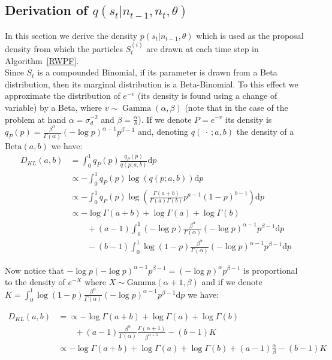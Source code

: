 \documentclass[12pt]{article}
\begin{document}
\begin{appendices}
	\subsection{Derivation of $q(s_t|n_{t-1}, n_t, \theta)$}
	In this section we derive the density $p(s_t|n_{t-1}, \theta)$ which is used as the proposal density from which the particles $S_t^{(i)}$ are drawn at each time step in Algorithm~\ref{RWPF}. \\
	Since $S_t$ is a compounded Binomial, if its parameter is drawn from a Beta distribution, then its marginal distribution is a Beta-Binomial. To this effect we approximate the distribution of $e^{-v}$ (its density is found using a change of variable) by a Beta, where $v \sim \operatorname{Gamma}(\alpha, \beta)$ (note that in the case of the problem at hand $\alpha=\sigma_d^{-2}$ and $\beta=\frac{\alpha}{\delta}$). 
	If we denote $P=e^{-v}$ its density is $q_P(p)=\frac{\beta^\alpha}{\Gamma(\alpha)}(-\log p)^{\alpha-1}p^{\beta-1}$ and, denoting $q(\ \cdot \ ; a, b)$ the density of a $\mathrm{Beta}(a,b)$ we have:	
	\begin{align*}
	D_{KL}(a,b) & = \int_{0}^{1}q_P(p)\frac{q_P(p)}{q(p; a, b)}\mathrm{d}p \\
	& \propto - \int_{0}^{1}q_P(p)\log(q(p; a, b))\mathrm{d}p \\
	& \propto - \int_{0}^{1}q_P(p)\log(\frac{\Gamma(a+b)}{\Gamma(a)\Gamma(b)}p^{a-1}(1-p)^{b-1})\mathrm{d}p \\
	& \propto -\log\Gamma(a+b) + \log\Gamma(a) + \log\Gamma(b) \\ & \qquad  + (a-1)\int_{0}^{1}(-\log p)\frac{\beta^\alpha}{\Gamma(\alpha)}(-\log p)^{\alpha-1}p^{\beta-1}\mathrm{d}p \\ & \qquad - (b-1)\int_{0}^{1}\log (1-p)\frac{\beta^\alpha}{\Gamma(\alpha)}(-\log p)^{\alpha-1}p^{\beta-1}\mathrm{d}p
	\end{align*}
	
	Now notice that $-\log p(-\log p)^{\alpha-1}p^{\beta-1}= (-\log p)^{\alpha}p^{\beta-1}$ is proportional to the density of $e^{-X}$ where $X \sim \mathrm{Gamma}(\alpha+1, \beta)$ and if we denote $K=\int_{0}^{1}\log(1-p)\frac{\beta^\alpha}{\Gamma(\alpha)}(-\log p)^{\alpha-1}p^{\beta-1}\mathrm{d}p$ we have:
	
	\begin{equation*}
	\begin{split}
	D_{KL}(a,b) & = \propto -\log\Gamma(a+b) + \log\Gamma(a) + \log\Gamma(b) \\ 
	& \qquad  + (a-1)\frac{\beta^\alpha}{\Gamma(\alpha)}\frac{\Gamma(\alpha+1)}{\beta^{\alpha+1}} - (b-1)K \\
	& \propto -\log\Gamma(a+b) + \log\Gamma(a) + \log\Gamma(b) + (a-1)\frac{\alpha}{\beta} - (b-1)K
	\end{split}
	\end{equation*}
	

\end{appendices}
\end{document}
